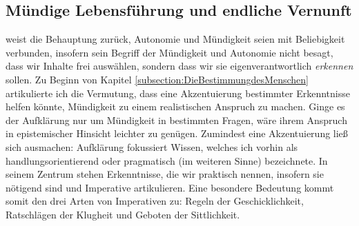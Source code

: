 \subsection{Mündige Lebensführung und endliche
Vernunft}\label{section:MuendigeLebensfuehrung}
\begin{comment}
An verschiedenen stellen beschreibt \name[Immanuel]{Kant} unseren Willen als
endlich, insofern er nicht -- wie ein \singlequote{heiliger} Wille -- den
Vorschriften der praktischen Vernunft von sich aus genügt, sondern mit einem
Gegensatz von Wollen und Sollen konfrontiert ist. Weil wir über antagonistische
Neigungen verfügen, begegnen uns Imperative der Vernunft, die einen nötigenden
Charakter haben.\footnote{Siehe
\cite[][BA 40, 86\,f.,]{Kant:GrundlegungzurMetaphysikderSitten1965} \cite[][IV:
414.26--31, 439.28--440.13]{Kant:GesammelteWerke1900ff.};
\cite[][A 56--58, 145--150]{Kant:KritikderpraktischenVernunft1974}, \cite[][V:
32.1--33.5, 81.20--84.21]{Kant:GesammelteWerke1900ff.};
\cite[][\S~76]{Kant:KritikderUrteilskraft2009}, \cite[][V:
403.20--404.16]{Kant:GesammelteWerke1900ff.}.} Die Endlichkeit oder
Fehlbarkeit der praktischen Vernunft oder des Willens bezeichnet nach
\name[Immanuel]{Kant} den Sachverhalt, dass wir wider bessere Einsicht zu
handeln geneigt sind, weil unsere unmittelbaren Neigungen und Bedürfnisse der
Orientierung an vernünftigen Grundsätzen des Handelns -- praktischen
Erkenntnissen -- im Wege stehen. Wie ich im verbleibenden Teil dieses Kapitels
zeigen werde, ist es diese (praktische) Endlichkeit, die unserer Mündigkeit
zunächst im Weg steht, nicht eine vermeintliche (kognitive) Endlichkeit, der
zufolge wir die richtigen Einsichten nicht unabhängig vom Rekurs auf das Wissen
anderer zu generieren vermögen.
\end{comment}

 weist die Behauptung zurück, Autonomie und Mündigkeit
seien mit Beliebigkeit verbunden, insofern sein Begriff der Mündigkeit und
Autonomie nicht besagt, dass wir Inhalte frei auswählen, sondern dass wir sie
eigenverantwortlich \emph{erkennen} sollen. Zu Beginn von Kapitel
\ref{subsection:DieBestimmungdesMenschen} artikulierte ich die Vermutung, dass
eine Akzentuierung bestimmter Erkenntnisse helfen könnte, Mündigkeit zu einem
realistischen Anspruch zu machen. Ginge es der Aufklärung nur um Mündigkeit in
bestimmten Fragen, wäre ihrem Anspruch in epistemischer Hinsicht leichter zu
genügen. Zumindest eine Akzentuierung ließ sich ausmachen: Aufklärung fokussiert
Wissen, welches ich vorhin als handlungsorientierend oder pragmatisch (im
weiteren Sinne) bezeichnete. In seinem Zentrum stehen Erkenntnisse, die wir
praktisch nennen, insofern sie nötigend sind und Imperative artikulieren. Eine
besondere Bedeutung kommt somit den drei Arten von Imperativen zu: Regeln der
Geschicklichkeit, Ratschlägen der Klugheit und Geboten der Sittlichkeit.

